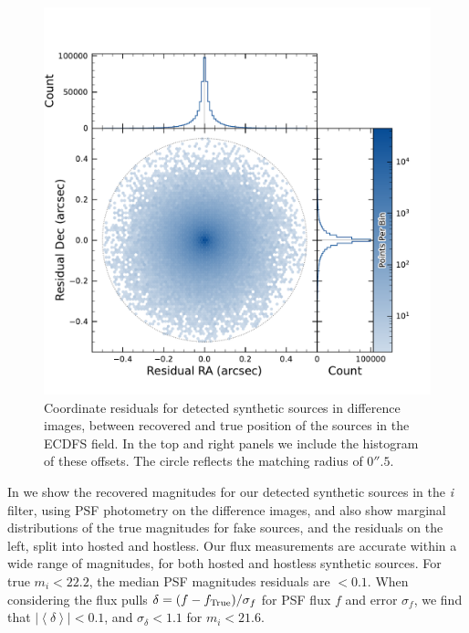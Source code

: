 \begin{figure}[htb!]
\centering
\includegraphics[trim={0 0 0 0},width=\linewidth]{figures/coordinate_offsets_hexbin.pdf}
\caption{Coordinate residuals for detected synthetic sources in difference images, between recovered and true position of the sources in the \gls{ECDFS} field. In the top and right panels we include the histogram of these offsets. The circle reflects the matching radius of $0''.5$.}
\label{fig:coordinate_offset_diffim_fakes}
\end{figure}
%
In  we show the recovered magnitudes for our detected synthetic sources in the \textit{i} filter, using \gls{PSF} photometry on the difference images, and also show marginal distributions of the true magnitudes for fake sources, and the residuals on the left, split into hosted and hostless.
%
Our \gls{flux} measurements are accurate within a wide range of magnitudes, for both hosted and hostless synthetic sources. 
For true $m_i < 22.2$, the median PSF magnitudes residuals are $<0.1$. 
When considering the \gls{flux} pulls $\delta = (f-f_{\rm{True}})/\sigma_f$ for PSF \gls{flux} $f$ and error $\sigma_f$, we find that $|\left<\delta\right>| <0.1$, and $\sigma_\delta < 1.1$ for $m_i<21.6$.
%
